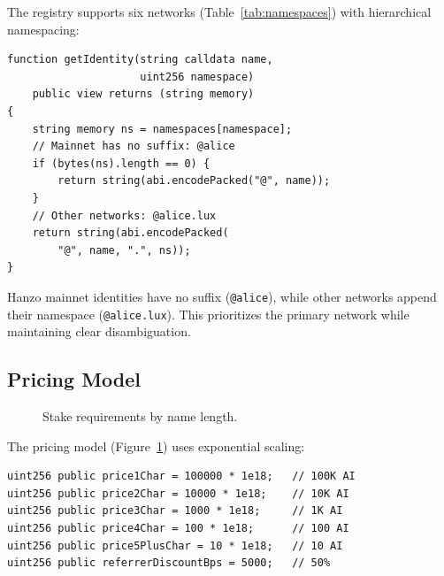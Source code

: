\documentclass[11pt,twocolumn]{article}
\begin{document}
The registry supports six networks (Table~\ref{tab:namespaces}) with hierarchical namespacing:

\begin{lstlisting}[language=Solidity]
function getIdentity(string calldata name,
                     uint256 namespace)
    public view returns (string memory)
{
    string memory ns = namespaces[namespace];
    // Mainnet has no suffix: @alice
    if (bytes(ns).length == 0) {
        return string(abi.encodePacked("@", name));
    }
    // Other networks: @alice.lux
    return string(abi.encodePacked(
        "@", name, ".", ns));
}
\end{lstlisting}

Hanzo mainnet identities have no suffix (\texttt{@alice}), while other networks append their namespace (\texttt{@alice.lux}). This prioritizes the primary network while maintaining clear disambiguation.

\subsection{Pricing Model}

\begin{figure}[t]
\centering
{}
\caption{Stake requirements by name length.}
\label{fig:pricing}
\end{figure}

The pricing model (Figure~\ref{fig:pricing}) uses exponential scaling:

\begin{lstlisting}[language=Solidity]
uint256 public price1Char = 100000 * 1e18;   // 100K AI
uint256 public price2Char = 10000 * 1e18;    // 10K AI
uint256 public price3Char = 1000 * 1e18;     // 1K AI
uint256 public price4Char = 100 * 1e18;      // 100 AI
uint256 public price5PlusChar = 10 * 1e18;   // 10 AI
uint256 public referrerDiscountBps = 5000;   // 50%
\end{lstlisting}
\end{document}
